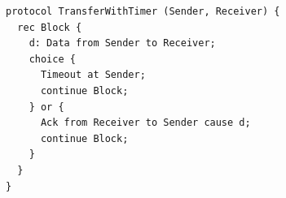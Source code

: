 \begin{lstlisting}[language={}]
protocol TransferWithTimer (Sender, Receiver) {
  rec Block {
    d: Data from Sender to Receiver;
    choice {
      Timeout at Sender;
      continue Block;
    } or {
      Ack from Receiver to Sender cause d;
      continue Block;
    }
  }
}
\end{lstlisting}
